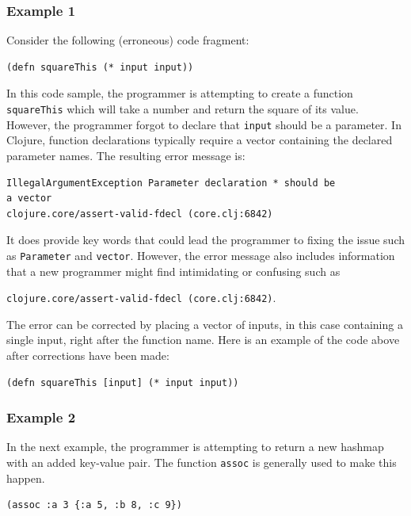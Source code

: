 \documentclass[12pt]{article}
\newcommand{\comment}[1]{{\bf \tt  {#1}}}
\newcommand{\emcomment}[1]{\textcolor{ForestGreen}{\comment{Elena: {#1}}}}
\begin{document}
\subsubsection{Example 1}\label{sec:ex1}

Consider the following (erroneous) code fragment:
\begin{verbatim}
(defn squareThis (* input input))
\end{verbatim}

In this code sample, the programmer is attempting to create a function \texttt{squareThis} which will take a number and return the square of its value.
However, the programmer forgot to declare that \texttt{input} should be a parameter.
In Clojure, function declarations typically require a vector containing the declared parameter names.
The resulting error message is: 
\begin{verbatim}
IllegalArgumentException Parameter declaration * should be 
a vector 
clojure.core/assert-valid-fdecl (core.clj:6842)
\end{verbatim}
It does provide key words that could lead the programmer to fixing the issue such as \texttt{Parameter} and \texttt{vector}.
However, the error message also includes information that a new programmer might find intimidating or confusing such as 

\noindent
\texttt{clojure.core/assert-valid-fdecl (core.clj:6842)}.



The error can be corrected by placing a vector of inputs, in this case containing a single input, right after the function name.
Here is an example of the code above after corrections have been made:
\begin{verbatim}
(defn squareThis [input] (* input input))
\end{verbatim}

\subsubsection{Example 2}\label{sec:ex2}

In the next example, the programmer is attempting to return a new hashmap with an added key-value pair.
The function \texttt{assoc} is generally used to make this happen.
\begin{verbatim}
(assoc :a 3 {:a 5, :b 8, :c 9})
\end{verbatim}
\end{document}
